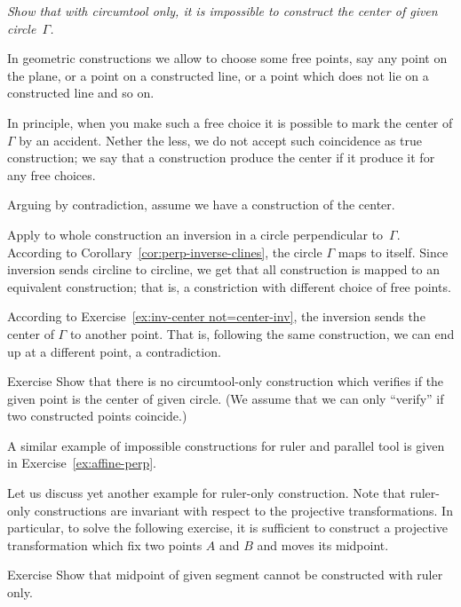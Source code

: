 \textit{Show that with circumtool only,
it is impossible to construct the center of given circle~$\Gamma$.}
\medskip

In geometric constructions we allow to choose some free points,
say any point on the plane, or a point on a constructed line, or a point which does not lie on a constructed line and so on.

In principle, when you make such a free choice it is possible to mark the center of $\Gamma$ by an accident.
Nether the less, we do not accept such coincidence as true construction; 
we say that a construction produce the center if it produce it for any free choices.


\label{page:solution-for-ex:circumtool}
Arguing by contradiction, 
assume we have a construction of the center. 

Apply to whole construction an inversion in a circle perpendicular to~$\Gamma$.
According to Corollary~\ref{cor:perp-inverse-clines},
the circle
$\Gamma$ maps to itself.
Since inversion sends circline to circline, we get that all construction is mapped to an equivalent construction; 
that is, a constriction with different choice of free points.

According to Exercise~\ref{ex:inv-center not=center-inv}, 
the inversion sends the center of $\Gamma$ to another point.
That is, following the same construction, we can end up at a different point, a contradiction.
\qeds

\begin{thm}{Exercise}\label{ex:center-verify}
Show that there is no circumtool-only construction which verifies if the given point is the center of given circle.
(We assume that we can only ``verify'' if two constructed points coincide.) 
\end{thm}

A similar example of impossible constructions for ruler and parallel tool
 is given in Exercise~\ref{ex:affine-perp}.
 
Let us discuss yet another example for ruler-only construction.
Note that ruler-only constructions are invariant with respect to the projective transformations. 
In particular, to solve the following exercise, it is sufficient to construct a projective transformation which fix two points $A$ and $B$ and moves its midpoint.

\begin{thm}{Exercise}\label{ex:midpoint-proj}
Show that  midpoint of given segment cannot be constructed with ruler only.
\end{thm}

